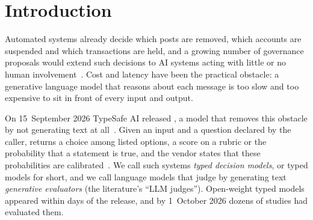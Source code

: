 \section{Introduction}
\label{sec:intro}

Automated systems already decide which posts are removed, which accounts are suspended and which transactions are held, and a growing number of governance proposals would extend such decisions to AI systems acting with little or no human involvement~\cite{gorwa2020algorithmic,gillespie2018custodians,citron2008technological}.
Cost and latency have been the practical obstacle: a generative language model that reasons about each message is too slow and too expensive to sit in front of every input and output.

On 15~September 2026 TypeSafe AI released \jev{}, a model that removes this obstacle by not generating text at all~\cite{almeida2026introducing,typesafe_intro}.
Given an input and a question declared by the caller, \jev{} returns a choice among listed options, a score on a rubric or the probability that a statement is true, and the vendor states that these probabilities are calibrated~\cite{typesafe_primer,typesafe_models}.
We call such systems \emph{typed decision models}, or typed models for short, and we call language models that judge by generating text \emph{generative evaluators} (the literature's ``LLM judges'').
Open-weight typed models appeared within days of the release, and by 1~October 2026 dozens of studies had evaluated them.

